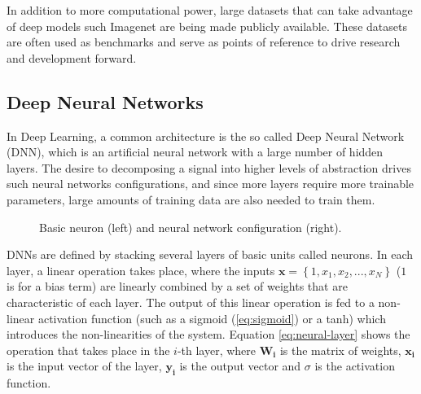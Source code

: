 In addition to more computational power, large datasets that can take advantage of deep models such Imagenet \cite{russakovsky2015imagenet} are being made publicly available. These datasets are often used as benchmarks and serve as points of reference to drive research and development forward.


\subsection{Deep Neural Networks}

In Deep Learning, a common architecture is the so called Deep Neural Network (DNN), which is an artificial neural network with a large number of hidden layers. The desire to decomposing a signal into higher levels of abstraction drives such neural networks configurations, and since more layers require more trainable parameters, large amounts of training data are also needed to train them.

\begin{figure}[h]
    \centering
    \scalebox{.75} {  }
    \scalebox{.5} {  }
    \caption{Basic neuron (left) and neural network configuration (right).}
    \label{fig:neural-net}
\end{figure}

DNNs are defined by stacking several layers of basic units called neurons. In each layer, a linear operation takes place, where the inputs $\mathbf{x}= \left \{ 1, x_1, x_2, ..., x_N \right \}$ ($1$ is for a bias term) are linearly combined by a set of weights that are characteristic of each layer. The output of this linear operation is fed to a non-linear activation function (such as a sigmoid (\eqref{eq:sigmoid}) or a tanh) which introduces the non-linearities of the system. Equation \eqref{eq:neural-layer} shows the operation that takes place in the $i$-th layer, where $\mathbf{W_i}$  is the matrix of weights, $\mathbf{x_i}$ is the input vector of the layer, $\mathbf{y_i}$ is the output vector and $\sigma$ is the activation function.

